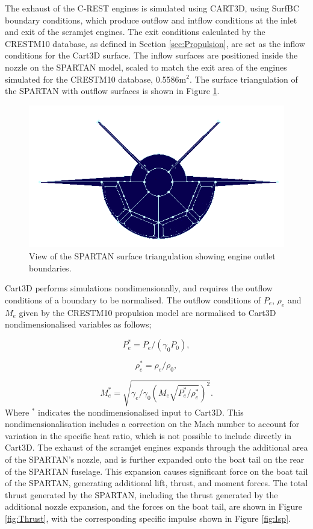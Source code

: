 The exhaust of the C-REST engines is simulated using CART3D, using SurfBC boundary conditions, which produce outflow and intflow conditions at the inlet and exit of the scramjet engines\cite{Pandya2004}. The exit conditions calculated by the \textsf{CRESTM10} database, as defined in Section \ref{sec:Propulsion}, are set as the inflow conditions for the Cart3D surface. 
The inflow surfaces are positioned inside the nozzle on the SPARTAN model, scaled to match the exit area of the engines simulated for the \textsf{CRESTM10} database, 0.5586m$^2$. The surface triangulation of the SPARTAN with outflow surfaces is shown in Figure \ref{fig:Pointwise-EngineBC}.
\begin{figure}[ht]
	\centering
	\includegraphics[width=0.7\linewidth]{figures/3_vehicle_design/Pointwise-EngineBC}
	\caption{View of the SPARTAN surface triangulation showing engine outlet boundaries.}
	\label{fig:Pointwise-EngineBC}
\end{figure}
Cart3D performs simulations nondimensionally, and requires the outflow conditions of a boundary to be normalised. The outflow conditions of $P_e$, $\rho_e$ and $M_e$ given by the \textsf{CRESTM10 }propulsion model are normalised to Cart3D nondimensionalised variables as follows\cite{Cartplumes,Mehta2015};

\begin{equation}
P_e^* = P_e/(\gamma_0 P_0),
\end{equation}

\begin{equation}
\rho_e^* = \rho_e/\rho_0,
\end{equation}

\begin{equation}
M_e^* = \sqrt{\gamma_e/\gamma_0 (M_e \sqrt{ P_e^*/\rho_e^*})^2}.
\end{equation}
Where $^*$ indicates the nondimensionalised input to Cart3D. This nondimensionalisation includes a correction on the Mach number to account for variation in the specific heat ratio, which is not possible to include directly in Cart3D\cite{Mehta2016}. The exhaust of the scramjet engines expands through the additional area of the SPARTAN's nozzle, and is further expanded onto the boat tail on the rear of the SPARTAN fuselage. This expansion causes significant force on the boat tail of the SPARTAN, generating additional lift, thrust, and moment forces. The total thrust generated by the SPARTAN, including the thrust generated by the additional nozzle expansion, and the forces on the boat tail, are shown in Figure \ref{fig:Thrust}, with the corresponding specific impulse shown in Figure \ref{fig:Isp}.




